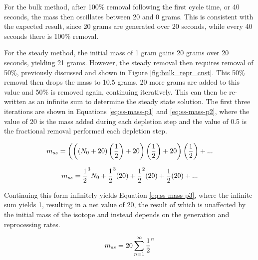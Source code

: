 For the bulk method, after 100\% removal following the first cycle time, or 40 seconds, the mass then oscillates between 20 and 0 grams. 
This is consistent with the expected result, since 20 grams are generated over 20 seconds, while every 40 seconds there is 100\% removal. 

For the steady method, the initial mass of 1 gram gains 20 grams over 20 seconds, yielding 21 grams. However, the steady removal then requires removal of 50\%, previously discussed and shown in Figure \ref{fig:bulk_repr_cnst}. This 50\% removal then drops the mass to 10.5 grams. 20 more grams are added to this value and 50\% is removed again, continuing iteratively. This can then be re-written as an infinite sum to determine the steady state solution. The first three iterations are shown in Equations \eqref{eq:ss-mass-p1} and \eqref{eq:ss-mass-p2}, where the value of 20 is the mass added during each depletion step and the value of 0.5 is the fractional removal performed each depletion step. 


\begin{equation} \hfill 
m_{ss} = \left( \left( \left(N_0+20 \right) \left(\frac{1}{2} \right)+20 \right)\left(\frac{1}{2} \right)+20 \right)\left(\frac{1}{2} \right) + ...
\hfill\label{eq:ss-mass-p1} \end{equation}

\begin{equation} \hfill 
m_{ss} = \frac{1}{2}^3 N_0 + \frac{1}{2}^3 (20) + \frac{1}{2}^2 (20) + \frac{1}{2} (20) + ...
\hfill\label{eq:ss-mass-p2} \end{equation}

Continuing this form infinitely yields Equation \eqref{eq:ss-mass-p3}, where the infinite sum yields 1, resulting in a net value of 20, the result of which is unaffected by the initial mass of the isotope and instead depends on the generation and reprocessing rates.

\begin{equation} \hfill 
m_{ss} = 20 \sum_{n=1}^\infty \frac{1}{2}^n 
\hfill\label{eq:ss-mass-p3} \end{equation}

